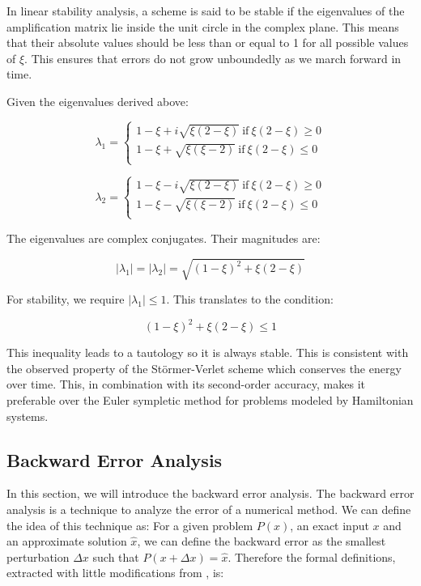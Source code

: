 \documentclass{report}
\begin{document}
In linear stability analysis, a scheme is said to be stable if the eigenvalues of the amplification matrix lie inside the unit circle in the complex plane. This means that their absolute values should be less than or equal to 1 for all possible values of \( \xi \). This ensures that errors do not grow unboundedly as we march forward in time.

Given the eigenvalues derived above:

\[
	\lambda_1 = \begin{cases}
		1 - \xi + i\sqrt{\xi(2-\xi)} \ \text{if} \ \xi(2-\xi) \geq 0 \\
		1 - \xi + \sqrt{\xi(\xi - 2)} \ \text{if} \ \xi(2-\xi) \leq 0 \\
	\end{cases}
\]

\[
	\lambda_2 = \begin{cases}
		1 - \xi - i\sqrt{\xi(2-\xi)} \ \text{if} \ \xi(2-\xi) \geq 0 \\
		1 - \xi - \sqrt{\xi(\xi - 2)} \ \text{if} \ \xi(2-\xi) \leq 0 \\
	\end{cases}
\]

The eigenvalues are complex conjugates. Their magnitudes are:

\[
	|\lambda_1| = |\lambda_2| = \sqrt{(1 - \xi)^2 + \xi(2-\xi)} 
\]

For stability, we require \( |\lambda_1| \leq 1 \). This translates to the condition:

\[
	(1 - \xi)^2 + \xi(2-\xi) \leq 1
\]

This inequality leads to a tautology so it is always stable. This is consistent with the observed property of the Störmer-Verlet scheme which conserves the energy over time. This, in combination with its second-order accuracy, makes it preferable over the Euler sympletic method for problems modeled by Hamiltonian systems.

\subsection{Backward Error Analysis}
\label{sec:backward_error_analysis}

In this section, we will introduce the backward error analysis. The backward error analysis is a technique to analyze the error of a numerical method. We can define the idea of this technique as: For a given problem \(P(x)\), an exact input \(x\) and an approximate solution \(\hat{x}\), we can define the backward error as the smallest perturbation \(\Delta x\) such that \(P(x + \Delta x) = \hat{x}\). Therefore the formal definitions, extracted with little modifications from \cite{fraysse2018hdr}, is:
\end{document}
